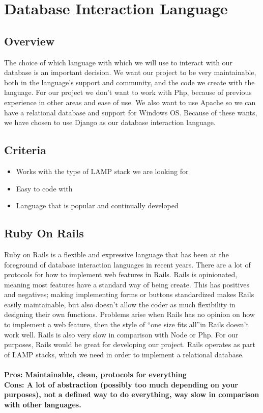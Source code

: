 \documentclass[draftclsnofoot,onecolumn,letterpaper,10pt,compsoc]{IEEEtran}
\begin{document}
\section{Database Interaction Language}
\subsection{Overview}
	The choice of which language with which we will use to interact with our database is an important decision.
	We want our project to be very maintainable, both in the language's support and community, and the code we create with the language.
	For our project we don’t want to work with Php, because of previous experience in other areas and ease of use.
	We also want to use Apache so we can have a relational database and support for Windows OS.
	Because of these wants, we have chosen to use Django as our database interaction language.
	\subsection{Criteria}
	\begin{itemize}
	\item Works with the type of LAMP stack we are looking for
	\item Easy to code with
	\item Language that is popular and continually developed
	\end{itemize}
	\subsection{Ruby On Rails}
		Ruby on Rails is a flexible and expressive language that has been at the foreground of database interaction languages in recent years.
		There are a lot of protocols for how to implement web features in Rails.
		Rails is opinionated, meaning most features have a standard way of being create\cite{Medium}.
		This has positives and negatives; making implementing forms or buttons standardized makes Rails easily maintainable, but also doesn't allow the coder as much flexibility in designing their own functions.
		Problems arise when Rails has no opinion on how to implement a web feature, then the style of \textquotedblleft one size fits all\textquotedblright in Rails doesn't work well\cite{Medium}.
		Rails is also very slow in comparison with Node or Php\cite{Medium}.
		For our purposes, Rails would be great for developing our project.
		Rails operates as part of LAMP stacks, which we need in order to implement a relational database.
		\\ \\
		\textbf{Pros: Maintainable, clean, protocols for everything}
		\\
		\textbf{Cons: A lot of abstraction (possibly too much depending on your purposes), not a defined way to do everything, way slow in comparison with other languages.}
\end{document}
